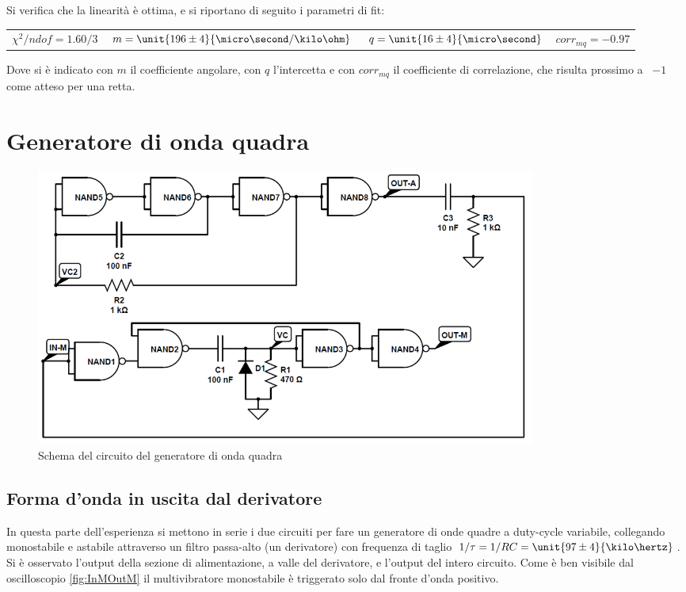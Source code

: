 \documentclass[a4paper,10pt]{article}
\begin{document}
Si verifica che la linearità è ottima, e si riportano di seguito i parametri di fit:

\begin{table}[H]
	\centering
	\begin{tabular}{cccc}
		$\chi^2/ndof = 1.60/3$ & $m = \unit{196 \pm 4}{\micro\second / \kilo\ohm}$ & $q = \unit{16 \pm 4}{\micro\second}$ & $corr_{mq} = -0.97$\\
	\end{tabular}
\end{table}

Dove si è indicato con $m$ il coefficiente angolare, con $q$ l'intercetta e con $corr_{mq}$ il coefficiente di correlazione, che risulta prossimo a ~$-1$ come atteso per una retta.

\section{Generatore di onda quadra}

\begin{figure}[H]
	\centering
	\includegraphics[width=0.8\textwidth]{../grafici/SqGen.png}
	\caption{Schema del circuito del generatore di onda quadra}
	\label{fig:SQGEN}
\end{figure}

\subsection{Forma d'onda in uscita dal derivatore}

In questa parte dell'esperienza si mettono in serie i due circuiti per fare un generatore di onde quadre a duty-cycle variabile, collegando monostabile e astabile attraverso un filtro passa-alto (un derivatore) con frequenza di taglio $1/\tau=1/RC=\unit{97 \pm 4}{\kilo\hertz}$.\\
Si è osservato l'output della sezione di alimentazione, a valle del derivatore, e l'output del intero circuito. Come è ben visibile dal oscilloscopio \cref{fig:InMOutM} il multivibratore monostabile è triggerato solo dal fronte d'onda positivo. 
\end{document}
